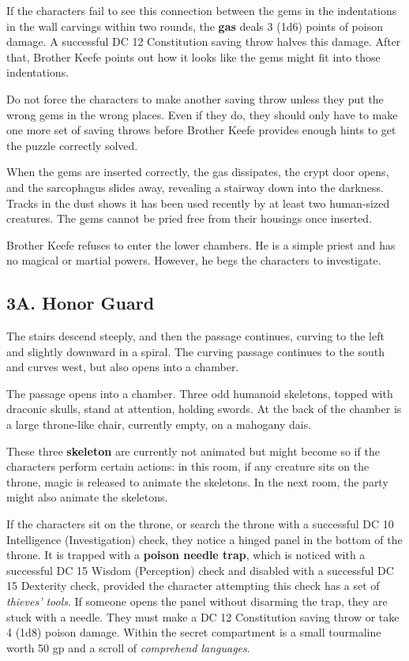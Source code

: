 \documentclass[10pt,a4paper,twoside,bg=print,twocolumn,openany,nodeprecatedcode]{dndbook}
\begin{document}
If the characters fail to see this connection between the gems in the indentations in the wall carvings within two rounds, the \textbf{gas} deals 3 (1d6) points of poison damage. A successful DC 12 Constitution saving throw halves this damage. After that, Brother Keefe points out how it looks like the gems might fit into those indentations.

Do not force the characters to make another saving throw unless they put the wrong gems in the wrong places. Even if they do, they should only have to make one more set of saving throws before Brother Keefe provides enough hints to get the puzzle correctly solved.

When the gems are inserted correctly, the gas dissipates, the crypt door opens, and the sarcophagus slides away, revealing a stairway down into the darkness. Tracks in the dust shows it has been used recently by at least two human-sized creatures. The gems cannot be pried free from their housings once inserted.

Brother Keefe refuses to enter the lower chambers. He is a simple priest and has no magical or martial powers. However, he begs the characters to investigate.

\subsection{3A. Honor Guard}
The stairs descend steeply, and then the passage continues, curving to the left and slightly downward in a spiral. The curving passage continues to the south and curves west, but also opens into a chamber.

\begin{DndReadAloud}{}
The passage opens into a chamber. Three odd humanoid skeletons, topped with draconic skulls, stand at attention, holding swords. At the back of the chamber is a large throne-like chair, currently empty, on a mahogany dais.

\end{DndReadAloud}

These three \textbf{skeleton} are currently not animated but might become so if the characters perform certain actions: in this room, if any creature sits on the throne, magic is released to animate the skeletons. In the next room, the party might also animate the skeletons.

If the characters sit on the throne, or search the throne with a successful DC 10 Intelligence (Investigation) check, they notice a hinged panel in the bottom of the throne. It is trapped with a \textbf{poison needle trap}, which is noticed with a successful DC 15 Wisdom (Perception) check and disabled with a successful DC 15 Dexterity check, provided the character attempting this check has a set of \textit{thieves' tools}. If someone opens the panel without disarming the trap, they are stuck with a needle. They must make a DC 12 Constitution saving throw or take 4 (1d8) poison damage. Within the secret compartment is a small tourmaline worth 50 gp and a scroll of \textit{comprehend languages}.
\end{document}
